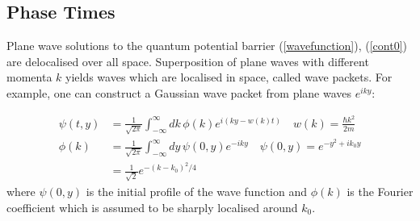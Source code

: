 \documentclass{article}
\begin{document}

\subsection{Phase Times}
\label{subsection:phasetime}

Plane wave solutions to the quantum potential barrier (\ref{wavefunction}), (\ref{cont0}) are delocalised over all space. Superposition of plane waves with different momenta $k$ yields waves which are localised in space, called wave packets. For example, one can construct a Gaussian wave packet from plane waves $e^{iky}$:

\begin{subequations}
\begin{align}
	\psi(t,y)&=\frac{1}{\sqrt{2\pi}}\int_{-\infty}^{\infty}dk\,\phi(k)e^{i(ky-w(k)t)} \quad w(k)=\frac{\hbar k^2}{2m} \label{gauss1}\\
	\phi(k)&=\frac{1}{\sqrt{2\pi}}\int_{-\infty}^{\infty}dy\,\psi(0,y)e^{-iky} \quad \psi(0,y) = e^{-y^2+ik_0y}\\
	&= \frac{1}{\sqrt{2}}e^{-(k-k_0)^2/4}
	\end{align}
\end{subequations}
\noindent where $\psi(0,y)$ is the initial profile of the wave function and $\phi(k)$ is the Fourier coefficient which is assumed to be sharply localised around $k_0$. 
\end{document}
